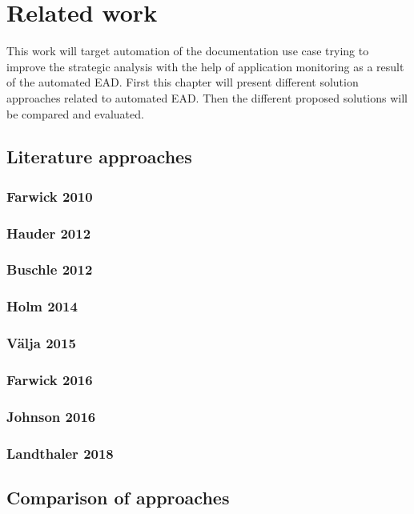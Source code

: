 \chapter{Related work}\label{chapter:related work}

This work will target automation of the documentation use case trying to improve the strategic analysis with the help of application monitoring as a result of the automated EAD. First this chapter will present different solution approaches related to automated EAD. Then the different proposed solutions will be compared and evaluated. 

\section{Literature approaches}

\subsection{Farwick 2010}

\subsection{Hauder 2012}

\subsection{Buschle  2012}

\subsection{Holm  2014}

\subsection{Välja 2015}

\subsection{Farwick 2016}

\subsection{Johnson 2016}

\subsection{Landthaler 2018}

\section{Comparison of approaches}
